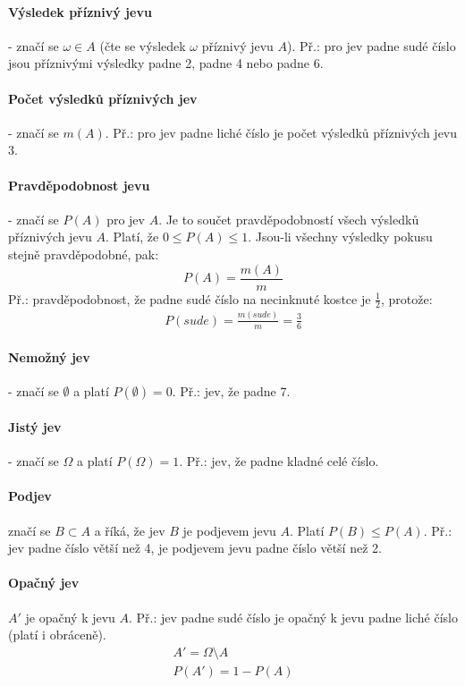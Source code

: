 \documentclass[12pt]{article}
\begin{document}
\paragraph{Výsledek příznivý jevu} - značí se $\omega \in A$ (čte se výsledek $\omega$ příznivý jevu $A$). Př.: pro jev padne sudé číslo jsou příznivými výsledky padne 2, padne 4 nebo padne 6.
\paragraph{Počet výsledků příznivých jev} - značí se $m(A)$. Př.: pro jev padne liché číslo je počet výsledků příznivých jevu 3.
\paragraph{Pravděpodobnost jevu} - značí se $P(A)$ pro jev $A$. Je to součet pravděpodobností všech výsledků příznivých jevu $A$. Platí, že $0 \leq P(A) \leq 1$. Jsou-li všechny výsledky pokusu stejně pravděpodobné, pak:
\begin{equation}
P(A) = \frac{m(A)}{m}
\end{equation}
Př.: pravděpodobnost, že padne sudé číslo na necinknuté kostce je $\frac{1}{2}$, protože:
\begin{align*}
P(sude) = \frac{m(sude)}{m} = \frac{3}{6}
\end{align*}
\paragraph{Nemožný jev} - značí se $\emptyset$ a platí $P(\emptyset) = 0$. Př.: jev, že padne 7.
\paragraph{Jistý jev} - značí se $\Omega$ a platí $P(\Omega) =1$. Př.: jev, že padne kladné celé číslo.
\paragraph{Podjev} značí se $B \subset A$ a říká, že jev $B$ je podjevem jevu $A$. Platí $P(B) \leq P(A)$. Př.: jev padne číslo větší než 4, je podjevem jevu padne číslo větší než 2.
\paragraph{Opačný jev} $A'$ je opačný k jevu $A$. Př.: jev padne sudé číslo je opačný k jevu padne liché číslo (platí i obráceně).
\begin{align}
A' = \Omega \setminus A\\
P(A') = 1 - P(A)
\end{align}
\end{document}
